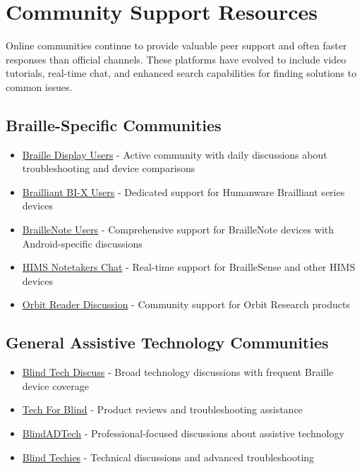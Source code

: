 \section{Community Support Resources}\label{listserv2}
Online communities continue to provide valuable peer support and often faster responses than official channels. These platforms have evolved to include video tutorials, real-time chat, and enhanced search capabilities for finding solutions to common issues.

\subsection{Braille-Specific Communities}
\begin{itemize}
 \item \href{https://groups.io/g/braille-display-users}{Braille Display Users} - Active community with daily discussions about troubleshooting and device comparisons
 \item \href{https://groups.io/g/Brailliant-BI-X-USERS/}{Brailliant BI-X Users} - Dedicated support for Humanware Brailliant series devices
 \item \href{https://groups.io/g/braillenote}{BrailleNote Users} - Comprehensive support for BrailleNote devices with Android-specific discussions
 \item \href{https://groups.io/g/hims-notetakers-chat}{HIMS Notetakers Chat} - Real-time support for BrailleSense and other HIMS devices
 \item \href{https://groups.io/g/orbit-reader}{Orbit Reader Discussion} - Community support for Orbit Research products
\end{itemize}

\subsection{General Assistive Technology Communities}
\begin{itemize}
 \item \href{https://groups.io/g/blindtechdiscuss}{Blind Tech Discuss} - Broad technology discussions with frequent Braille device coverage
 \item \href{https://groups.io/g/tech-for-blind}{Tech For Blind} - Product reviews and troubleshooting assistance
 \item \href{https://groups.io/g/blindadtech}{BlindADTech} - Professional-focused discussions about assistive technology
 \item \href{https://groups.io/g/blind-techies}{Blind Techies} - Technical discussions and advanced troubleshooting
\end{itemize}

